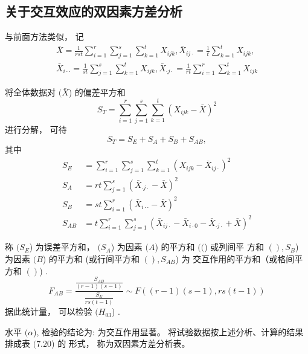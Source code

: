 \subsection{关于交互效应的双因素方差分析}

与前面方法类似， 记
\begin{equation}
\begin{array}{l}
\bar{X}=\frac{1}{r s t} \sum_{i=1}^{r} \sum_{j=1}^{s} \sum_{k=1}^{t} X_{i j k}, \bar{X}_{i j \cdot}=\frac{1}{t} \sum_{k=1}^{t} X_{i j k}, \\
\bar{X}_{i \cdot \cdot}=\frac{1}{s t} \sum_{j=1}^{s} \sum_{k=1}^{t} X_{i j k}, \bar{X}_{\cdot j \cdot}=\frac{1}{r t} \sum_{i=1}^{r} \sum_{k=1}^{t} X_{i j k}
\end{array}
\end{equation}

将全体数据对 $( \bar{X} $) 的偏差平方和
\begin{equation}
S_{T}=\sum_{i=1}^{r} \sum_{j=1}^{s} \sum_{k=1}^{t}\left(X_{i j k}-\bar{X}\right)^{2}
\end{equation}
进行分解， 可待
\begin{equation}
S_{T}=S_{E}+S_{A}+S_{B}+S_{A B},
\end{equation}
其中
\begin{equation}
\begin{aligned}
S_{E} &=\sum_{i=1}^{r} \sum_{j=1}^{s} \sum_{k=1}^{t}\left(X_{i j k}-\bar{X}_{i j \cdot}\right)^{2} \\
S_{A} &=r t \sum_{j=1}^{s}\left(\bar{X}_{\cdot j \cdot}-\bar{X}\right)^{2} \\
S_{B} &=s t \sum_{i=1}^{r}\left(\bar{X}_{i \cdot \cdot}-\bar{X}\right)^{2} \\
S_{A B} &=t \sum_{i=1}^{r} \sum_{j=1}^{s}\left(\bar{X}_{i j \cdot}-\bar{X}_{i \cdot 0}-\bar{X}_{\cdot j \cdot}+\bar{X}\right)^{2}
\end{aligned}
\end{equation}

称 $( S_{E} $) 为误差平方和，  $( {S}_{A} $) 为因素 $( {A} $) 的平方和 $( ( $) 或列间平 方和 $( ), S_{B} $) 为因素 $( B $) 的平方和 (或行间平方和 $( ), S_{A B} $) 为 交互作用的平方和（或格间平方和 $( ) $) . 
\begin{equation}
F_{A B}=\frac{\frac{S_{A B}}{(r-1)(s-1)}}{\frac{S_{E}}{r s(t-1)}} \sim F((r-1)(s-1), r s(t-1))
\end{equation}
据此统计量， 可以检验 $( {H}_{03} $) . 

水平 $( \alpha $), 检验的结论为:
为交互作用显著。 
将试验数据按上述分析、计算的结果排成表 $( 7.20 $) 的
形式， 称为双因素方差分析表。 

